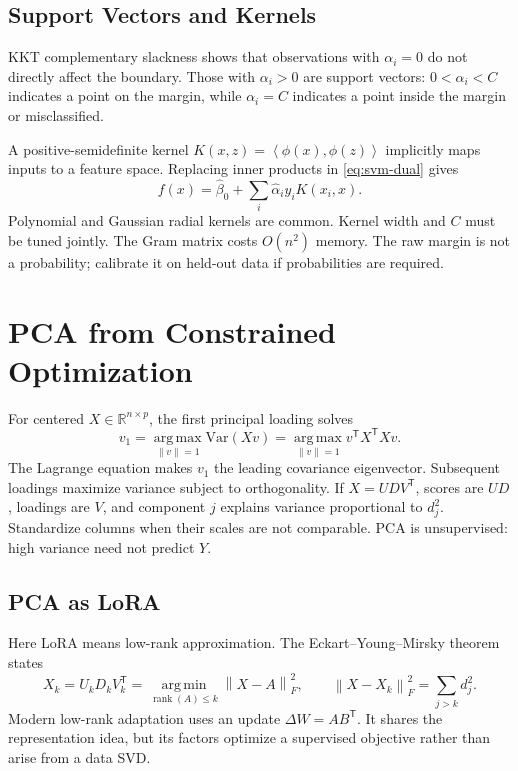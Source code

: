 \documentclass[12pt,oneside]{book}
\numberwithin{equation}{section}
\theoremstyle{definition}
\theoremstyle{plain}
\theoremstyle{remark}
\newcommand{\R}{\mathbb{R}}
\newcommand{\Var}{\mathrm{Var}}
\newcommand{\argmin}{\operatorname*{arg\,min}}
\newcommand{\argmax}{\operatorname*{arg\,max}}
\newcommand{\norm}[1]{\left\lVert #1 \right\rVert}
\newcommand{\inner}[2]{\left\langle #1, #2 \right\rangle}
\newcommand{\rank}{\operatorname{rank}}
\begin{document}
\subsection{Support Vectors and Kernels}

KKT complementary slackness shows that observations with $\alpha_i=0$ do not
directly affect the boundary. Those with $\alpha_i>0$ are support vectors:
$0<\alpha_i<C$ indicates a point on the margin, while $\alpha_i=C$ indicates
a point inside the margin or misclassified.

A positive-semidefinite kernel
$K(x,z)=\inner{\phi(x)}{\phi(z)}$ implicitly maps inputs to a feature space.
Replacing inner products in \eqref{eq:svm-dual} gives
\[
 f(x)=\widehat\beta_0+\sum_i\widehat\alpha_i y_iK(x_i,x).
\]
Polynomial and Gaussian radial kernels are common. Kernel width and $C$ must
be tuned jointly. The Gram matrix costs $O(n^2)$ memory. The raw margin is not
a probability; calibrate it on held-out data if probabilities are required.

\section{PCA from Constrained Optimization}

For centered $X\in\R^{n\times p}$, the first principal loading solves
\begin{equation}
 v_1=\argmax_{\norm v=1}\Var(Xv)
 =\argmax_{\norm v=1}v^\mathsf TX^\mathsf TXv.
 \label{eq:pca-rayleigh}
\end{equation}
The Lagrange equation makes $v_1$ the leading covariance eigenvector.
Subsequent loadings maximize variance subject to orthogonality. If
$X=UDV^\mathsf T$, scores are $UD$, loadings are $V$, and component $j$
explains variance proportional to $d_j^2$. Standardize columns when their
scales are not comparable. PCA is unsupervised: high variance need not predict
$Y$.

\subsection{PCA as LoRA}

Here LoRA means low-rank approximation. The Eckart--Young--Mirsky theorem
states
\begin{equation}
 X_k=U_kD_kV_k^\mathsf T
 =\argmin_{\rank(A)\leq k}\norm{X-A}_F^2,\qquad
 \norm{X-X_k}_F^2=\sum_{j>k}d_j^2.
 \label{eq:eckart-young}
\end{equation}
Modern low-rank adaptation uses an update $\Delta W=AB^\mathsf T$. It shares
the representation idea, but its factors optimize a supervised objective
rather than arise from a data SVD.
\end{document}
